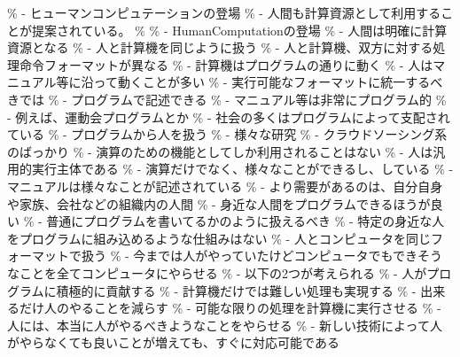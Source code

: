 \% - ヒューマンコンピュテーションの登場 \% -
人間も計算資源として利用することが提案されている。 \% \% -
HumanComputationの登場 \% - 人間は明確に計算資源となる \% -
人と計算機を同じように扱う \% -
人と計算機、双方に対する処理命令フォーマットが異なる \% -
計算機はプログラムの通りに動く \% -
人はマニュアル等に沿って動くことが多い \% -
実行可能なフォーマットに統一するべきでは \% - プログラムで記述できる \%
- マニュアル等は非常にプログラム的 \% - 例えば、運動会プログラムとか \%
- 社会の多くはプログラムによって支配されている \% -
プログラムから人を扱う \% - 様々な研究 \% -
クラウドソーシング系のばっかり \% -
演算のための機能としてしか利用されることはない \% -
人は汎用的実行主体である \% -
演算だけでなく、様々なことができるし、している \% -
マニュアルは様々なことが記述されている \% -
より需要があるのは、自分自身や家族、会社などの組織内の人間 \% -
身近な人間をプログラムできるほうが良い \% -
普通にプログラムを書いてるかのように扱えるべき \% -
特定の身近な人をプログラムに組み込めるような仕組みはない \% -
人とコンピュータを同じフォーマットで扱う \% -
今までは人がやっていたけどコンピュータでもできそうなことを全てコンピュータにやらせる
\% - 以下の2つが考えられる \% - 人がプログラムに積極的に貢献する \% -
計算機だけでは難しい処理も実現する \% - 出来るだけ人のやることを減らす
\% - 可能な限りの処理を計算機に実行させる \% -
人には、本当に人がやるべきようなことをやらせる \% -
新しい技術によって人がやらなくても良いことが増えても、すぐに対応可能である
